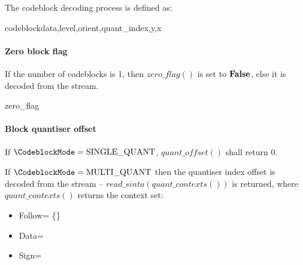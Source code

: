 The codeblock decoding process is defined as:

\begin{pseudo}{codeblock}{data,level,orient,quant\_index,y,x}
    \bsEND
  \bsEND
\bsELSE
    \bsEND
  \bsEND

\bsEND

\end{pseudo}

\paragraph{Zero block flag\newline}
\label{zeroblockflag}

If the number of codeblocks is 1, then $zero\_flag()$ is set to $\text{\bf{False}}$, else
it is decoded from the stream.

\begin{pseudo}{zero\_flag}{}
    \bsRET{\false}
\bsELSE
\bsEND
\end{pseudo}

\paragraph{Block quantiser offset\newline}
\label{blockquantidx}

If $\CodeblockMode=\SingleQuantiser$,  $quant\_offset()$ shall return 0.

If $\CodeblockMode=\MultipleQuantiser$ then the quantiser index offset
is decoded from the stream -- $read\_sinta(quant\_contexts())$ is returned, where
$quant\_contexts()$ returns the context set:

\begin{itemize}
\item{Follow= \{\QOffsetFollow\}}
\item{Data=\QOffsetData}
\item{Sign=\QOffsetSign}
\end{itemize}

